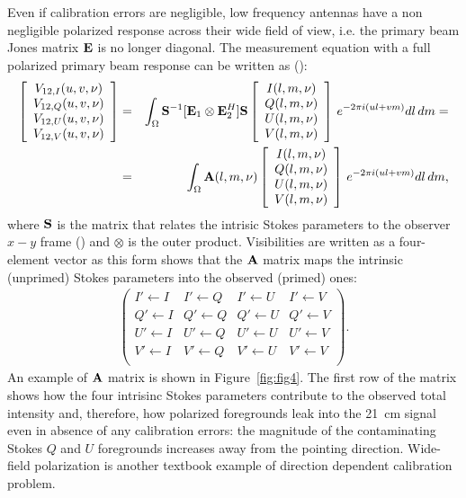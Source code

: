 \begin{itemize}
Even if calibration errors are negligible, low frequency antennas have a non negligible polarized response across their wide field of view, i.e. the primary beam Jones matrix ${\bf E}$ is no longer diagonal. The measurement equation with a full polarized primary beam response can be written as (\cite{nunhokee17}):
\begin{eqnarray}
    \left[ 
    \begin{array}{cc}
    V_{12,I} (u,v,\nu)\\
    V_{12,Q} (u,v,\nu)\\
    V_{12,U} (u,v,\nu)\\
    V_{12,V} (u,v,\nu)
    \end{array}
    \right] & = & \int_\Omega{ {\bf S}^{-1} [ {\bf E}_1 \otimes {\bf E}_2^H ] {\bf S} 
    \left[ 
    \begin{array}{cc}
    I (l,m,\nu)\\
    Q (l,m,\nu)\\
    U (l,m,\nu)\\
    V (l,m,\nu)
    \end{array}
    \right]
     \, e^{-2 \pi i (ul + vm)} dl \, dm } = \nonumber \\
     & = & \int_\Omega{ {\bf A} (l,m,\nu) 
    \left[ 
    \begin{array}{cc}
    I (l,m,\nu)\\
    Q (l,m,\nu)\\
    U (l,m,\nu)\\
    V (l,m,\nu)
    \end{array}
    \right]
     \, e^{-2 \pi i (ul + vm)} dl \, dm },
\label{eq:sec:8}
\end{eqnarray} 
where ${\bf S}$ is the matrix that relates the intrisic Stokes parameters to the observer $x-y$ frame (\cite{hamaker96}) and $\otimes$ is the outer product. Visibilities are written as a four-element vector as this form shows that the ${\bf A}$ matrix maps the intrinsic (unprimed) Stokes parameters into the observed (primed) ones: 
\begin{eqnarray}
    \left(
    \begin{array}{cccc}
    I' \leftarrow I & I' \leftarrow Q & I' \leftarrow U & I' \leftarrow V \\
    Q' \leftarrow I & Q' \leftarrow Q & Q' \leftarrow U & Q' \leftarrow V \\
    U' \leftarrow I & U' \leftarrow Q & U' \leftarrow U & U' \leftarrow V \\
    V' \leftarrow I & V' \leftarrow Q & V' \leftarrow U & V' \leftarrow V \\
    \end{array}
    \right).
\label{eq:sec:9}
\end{eqnarray} 
An example of ${\bf A}$ matrix is shown in Figure~\ref{fig:fig4}. The first row of the matrix shows how the four intrisinc Stokes parameters contribute to the observed total intensity and, therefore, how polarized foregrounds leak into the 21~cm signal even in absence of any calibration errors: the magnitude of the contaminating Stokes $Q$ and $U$ foregrounds increases away from the pointing direction. Wide-field polarization is another textbook example of direction dependent calibration problem.


\end{itemize}
